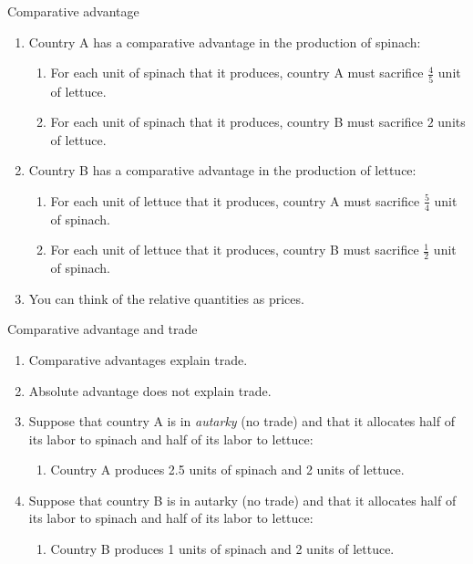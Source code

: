 \documentclass[table,xcolor=pdftex,dvipsnames]{beamer}\usepackage[]{graphicx}\usepackage[]{color}
\begin{document}
\begin{frame}{Comparative advantage}
\begin{enumerate}[label=\textbullet]
    \item Country A has a comparative advantage in the production of spinach:
      \begin{enumerate}[label=-]
        \item For each unit of spinach that it produces, country A must sacrifice $\frac{4}{5}$ unit of lettuce.
        \item For each unit of spinach that it produces, country B must sacrifice $2$ units of lettuce.
      \end{enumerate}
    \item Country B has a comparative advantage in the production of lettuce:
      \begin{enumerate}[label=-]
        \item For each unit of lettuce that it produces, country A must sacrifice $\frac{5}{4}$ unit of spinach.
        \item For each unit of lettuce that it produces, country B must sacrifice $\frac{1}{2}$ unit of spinach.
      \end{enumerate}
    \item You can think of the relative quantities as prices.
\end{enumerate}
\end{frame}


\begin{frame}{Comparative advantage and trade}
\begin{enumerate}[label=\textbullet]
    \item Comparative advantages explain trade.
    \item Absolute advantage does not explain trade.
    \item Suppose that country A is in \emph{autarky} (no trade) and that it allocates half of its labor to spinach and half of its labor to lettuce:
      \begin{enumerate}[label=-]
        \item Country A produces 2.5 units of spinach and 2 units of lettuce.
      \end{enumerate}
    \item Suppose that country B is in autarky (no trade) and that it allocates half of its labor to spinach and half of its labor to lettuce:
      \begin{enumerate}[label=-]
        \item Country B produces 1 units of spinach and 2 units of lettuce.
      \end{enumerate}
\end{enumerate}
\end{frame}
\end{document}
